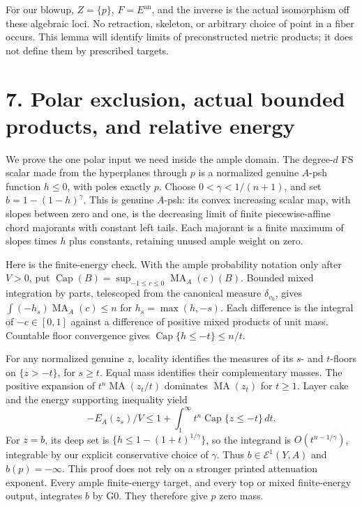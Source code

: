 \documentclass[
  10pt,
]{article}
\begin{document}
For our blowup, \(Z=\{p\}\), \(F=E^{\mathrm{an}}\), and the inverse is
the actual isomorphism off these algebraic loci. No retraction,
skeleton, or arbitrary choice of point in a fiber occurs. This lemma
will identify limits of preconstructed metric products; it does not
define them by prescribed targets.

\section{7. Polar exclusion, actual bounded products, and relative
energy}\label{polar-exclusion-actual-bounded-products-and-relative-energy}

We prove the one polar input we need inside the ample domain. The
degree-\(d\) FS scalar made from the hyperplanes through \(p\) is a
normalized genuine \(A\)-psh function \(h\le0\), with poles exactly
\(p\). Choose \(0<\gamma<1/(n+1)\), and set \(b=1-(1-h)^\gamma\). This
is genuine \(A\)-psh: its convex increasing scalar map, with slopes
between zero and one, is the decreasing limit of finite piecewise-affine
chord majorants with constant left tails. Each majorant is a finite
maximum of slopes times \(h\) plus constants, retaining unused ample
weight on zero.

Here is the finite-energy check. With the ample probability notation
only after \(V>0\), put
\(\operatorname{Cap}(B)=\sup_{-1\le c\le0}\operatorname{MA}_A(c)(B)\).
Bounded mixed integration by parts, telescoped from the canonical
measure \(\delta_{v_0}\), gives
\(\int(-h_s)\operatorname{MA}_A(c)\le n\) for \(h_s=\max(h,-s)\). Each
difference is the integral of \(-c\in[0,1]\) against a difference of
positive mixed products of unit mass. Countable floor convergence gives
\(\operatorname{Cap}\{h\le-t\}\le n/t\).

For any normalized genuine \(z\), locality identifies the measures of
its \(s\)- and \(t\)-floors on \(\{z>-t\}\), for \(s\ge t\). Equal mass
identifies their complementary masses. The positive expansion of
\(t^n\operatorname{MA}(z_t/t)\) dominates \(\operatorname{MA}(z_t)\) for
\(t\ge1\). Layer cake and the energy supporting inequality yield
\[-E_A(z_s)/V\le1+\int_1^\infty t^n\operatorname{Cap}\{z\le-t\}\,dt.\]
For \(z=b\), its deep set is \(\{h\le1-(1+t)^{1/\gamma}\}\), so the
integrand is \(O(t^{n-1/\gamma})\), integrable by our explicit
conservative choice of \(\gamma\). Thus \(b\in\mathcal E^1(Y,A)\) and
\(b(p)=-\infty\). This proof does not rely on a stronger printed
attenuation exponent. Every ample finite-energy target, and every top or
mixed finite-energy output, integrates \(b\) by G0. They therefore give
\(p\) zero mass.
\end{document}
